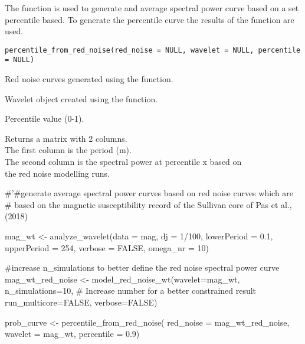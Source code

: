 \documentclass[a4paper]{book}
\begin{document}
%
\begin{Description}
The  function is
used to generate and average spectral power curve based on
a set percentile based. To generate the percentile curve the results of
the  function are used.
\end{Description}
%
\begin{Usage}
\begin{verbatim}
percentile_from_red_noise(red_noise = NULL, wavelet = NULL, percentile = NULL)
\end{verbatim}
\end{Usage}
%
\begin{Arguments}
\begin{ldescription}
\item[\code{red\_noise}] Red noise curves generated using the  function.

\item[\code{wavelet}] Wavelet object created using the  function.

\item[\code{percentile}] Percentile value (0-1).
\end{ldescription}
\end{Arguments}
%
\begin{Value}
Returns a matrix with 2 columns.\\{}
The first column is the period (m). \\{}
The second column is the spectral power at percentile x based on \\{}
the red noise modelling runs. \\{}
\end{Value}
%
\begin{Examples}
\begin{ExampleCode}

#'#generate average spectral power curves based on red noise curves which are
# based on the magnetic susceptibility record of the Sullivan core of Pas et al., (2018)

mag_wt <- analyze_wavelet(data = mag,
dj = 1/100,
lowerPeriod = 0.1,
upperPeriod = 254,
verbose = FALSE,
omega_nr = 10)

#increase n_simulations to better define the red noise spectral power curve
mag_wt_red_noise <- model_red_noise_wt(wavelet=mag_wt,
n_simulations=10, # Increase number for a better constrained result
run_multicore=FALSE,
verbose=FALSE)


prob_curve <- percentile_from_red_noise(
red_noise = mag_wt_red_noise,
wavelet = mag_wt,
percentile = 0.9)



\end{ExampleCode}
\end{Examples}
\end{document}

